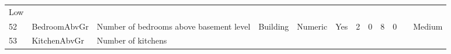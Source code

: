\documentclass[11pt]{article}
\begin{document}
\begin{longtable}[]{@{}llllllllllll@{}}
\begin{minipage}[t]{0.04\columnwidth}
Low\strut
\end{minipage}\tabularnewline
\begin{minipage}[t]{0.04\columnwidth}\raggedright\strut
52\strut
\end{minipage} & \begin{minipage}[t]{0.04\columnwidth}\raggedright\strut
BedroomAbvGr\strut
\end{minipage} & \begin{minipage}[t]{0.04\columnwidth}\raggedright\strut
Number of bedrooms above basement level\strut
\end{minipage} & \begin{minipage}[t]{0.04\columnwidth}\raggedright\strut
Building\strut
\end{minipage} & \begin{minipage}[t]{0.04\columnwidth}\raggedright\strut
Numeric\strut
\end{minipage} & \begin{minipage}[t]{0.04\columnwidth}\raggedright\strut
Yes\strut
\end{minipage} & \begin{minipage}[t]{0.04\columnwidth}\raggedright\strut
2\strut
\end{minipage} & \begin{minipage}[t]{0.04\columnwidth}\raggedright\strut
0\strut
\end{minipage} & \begin{minipage}[t]{0.04\columnwidth}\raggedright\strut
8\strut
\end{minipage} & \begin{minipage}[t]{0.04\columnwidth}\raggedright\strut
0\strut
\end{minipage} & \begin{minipage}[t]{0.04\columnwidth}\raggedright\strut
\strut
\end{minipage} & \begin{minipage}[t]{0.04\columnwidth}\raggedright\strut
Medium\strut
\end{minipage}\tabularnewline
\begin{minipage}[t]{0.04\columnwidth}\raggedright\strut
53\strut
\end{minipage} & \begin{minipage}[t]{0.04\columnwidth}\raggedright\strut
KitchenAbvGr\strut
\end{minipage} & \begin{minipage}[t]{0.04\columnwidth}\raggedright\strut
Number of kitchens\strut
\end{minipage} & \begin{minipage}[t]{0.04\columnwidth}\raggedright\strut

\end{minipage}
\end{longtable}
\end{document}
